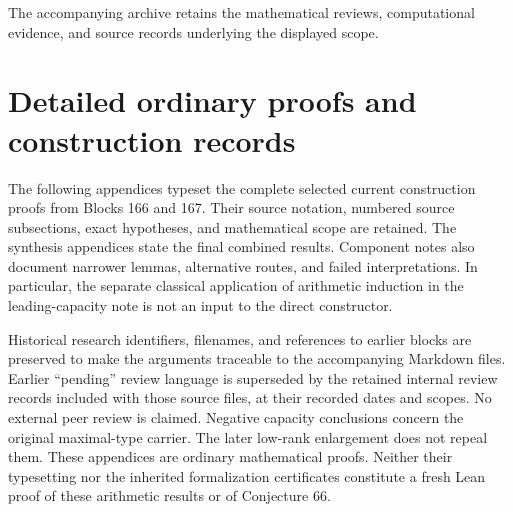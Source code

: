 \documentclass[11pt]{amsart}
\theoremstyle{definition}
\theoremstyle{remark}
\begin{document}
The accompanying archive retains the mathematical reviews, computational evidence, and source records underlying the displayed scope.

\clearpage
\appendix
\section*{Detailed ordinary proofs and construction records}
{}

The following appendices typeset the complete selected current construction
proofs from Blocks 166 and 167. Their source notation, numbered source
subsections, exact hypotheses, and mathematical scope are retained.
The synthesis appendices state the final combined results. Component notes
also document narrower lemmas, alternative routes, and failed interpretations.
In particular, the separate classical application of arithmetic induction in
the leading-capacity note is not an input to the direct constructor.

Historical research identifiers, filenames, and references to earlier
blocks are preserved to make the arguments traceable to the accompanying
Markdown files. Earlier ``pending'' review language is superseded by the
retained internal review records included with those source files, at their
recorded dates and scopes. No external peer review is claimed.
Negative capacity conclusions concern the original maximal-type carrier.
The later low-rank enlargement does not repeal them.
These appendices are ordinary mathematical proofs. Neither their typesetting
nor the inherited formalization certificates constitute a fresh Lean proof
of these arithmetic results or of Conjecture 66.

















\clearpage


\end{document}
